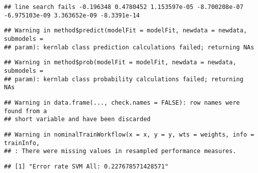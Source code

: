 \documentclass[
]{article}
\newenvironment{Shaded}{\begin{snugshade}}{\end{snugshade}}
\newcommand{\CommentTok}[1]{\textcolor[rgb]{0.56,0.35,0.01}{\textit{#1}}}
\newcommand{\FunctionTok}[1]{\textcolor[rgb]{0.13,0.29,0.53}{\textbf{#1}}}
\newcommand{\NormalTok}[1]{#1}
\newcommand{\OtherTok}[1]{\textcolor[rgb]{0.56,0.35,0.01}{#1}}
\newcommand{\SpecialCharTok}[1]{\textcolor[rgb]{0.81,0.36,0.00}{\textbf{#1}}}
\newcommand{\StringTok}[1]{\textcolor[rgb]{0.31,0.60,0.02}{#1}}
\begin{document}
\begin{verbatim}
## line search fails -0.196348 0.4780452 1.153597e-05 -8.700208e-07 -6.975103e-09 3.363652e-09 -8.3391e-14
\end{verbatim}

\begin{verbatim}
## Warning in method$predict(modelFit = modelFit, newdata = newdata, submodels =
## param): kernlab class prediction calculations failed; returning NAs
\end{verbatim}

\begin{verbatim}
## Warning in method$prob(modelFit = modelFit, newdata = newdata, submodels =
## param): kernlab class probability calculations failed; returning NAs
\end{verbatim}

\begin{verbatim}
## Warning in data.frame(..., check.names = FALSE): row names were found from a
## short variable and have been discarded
\end{verbatim}

\begin{verbatim}
## Warning in nominalTrainWorkflow(x = x, y = y, wts = weights, info = trainInfo,
## : There were missing values in resampled performance measures.
\end{verbatim}

\begin{Shaded}
\end{Shaded}

\begin{verbatim}
## [1] "Error rate SVM All: 0.227678571428571"
\end{verbatim}
\end{document}
